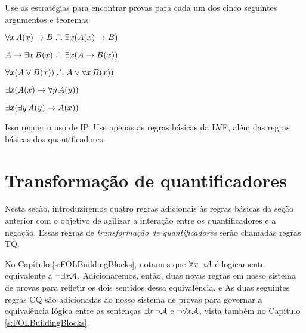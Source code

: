 \problempart
Use as estratégias para encontrar provas para cada um dos cinco seguintes argumentos e teoremas
\begin{earg}
\item $\forall x\,\mathord{A}(x) \rightarrow B \mathrel{\ldotp\dot{}\,\ldotp} \exists x(\mathord{A}(x) \rightarrow B)$
\item $A \rightarrow \exists x\, \mathord{B}(x) \mathrel{\ldotp\dot{}\,\ldotp} \exists x(A \rightarrow \mathord{B}(x))$
\item $\forall x(A \vee \mathord{B}(x)) \mathrel{\ldotp\dot{}\,\ldotp} A \vee \forall x\,\mathord{B}(x))$
\item $\exists x(\mathord{A}(x) \rightarrow \forall y\,\mathord{A}(y))$
\item $\exists x(\exists y\,\mathord{A}(y) \rightarrow \mathord{A}(x))$
\end{earg}
Isso requer o uso de IP. Use apenas as regras básicas da LVF, além das regras básicas dos quantificadores.


\chapter{Transformação de quantificadores}\label{s:CQ}

Nesta seção, introduziremos quatro regras adicionais às regras básicas da seção anterior com o objetivo de agilizar a interação entre os quantificadores e a negação. Essas regras de \textit{transformação de quantificadores} serão chamadas regras TQ.
 
No Capítulo  \ref{s:FOLBuildingBlocks}, notamos que $\forall x\, \neg\mathcal{A}$
   é logicamente equivalente a  $\neg\exists x\mathcal{A}$. Adicionaremos, então, duas novas regras em nosso sistema de provas para refletir os dois sentidos dessa equivalência.
e
As duas seguintes  regras CQ  são adicionadas ao nosso sistema de provas para governar a equivalência lógica entre as sentenças $\exists x\, \neg\mathcal{A}$  e   $\neg\forall x\mathcal{A}$, vista também no  Capítulo  \ref{s:FOLBuildingBlocks}.


